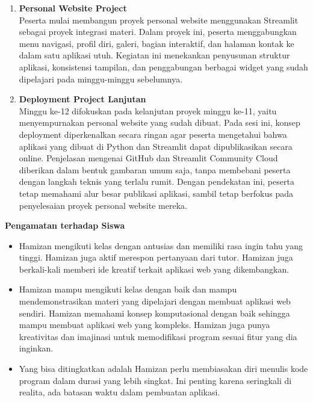 \documentclass[11pt,a4paper]{article}
\begin{document}
\begin{enumerate}[leftmargin=1.6em, label=\arabic*.]
\item \textbf{Personal Website Project}\\
Peserta mulai membangun proyek personal website menggunakan Streamlit sebagai proyek integrasi materi. Dalam proyek ini, peserta menggabungkan menu navigasi, profil diri, galeri, bagian interaktif, dan halaman kontak ke dalam satu aplikasi utuh. Kegiatan ini menekankan penyusunan struktur aplikasi, konsistensi tampilan, dan penggabungan berbagai widget yang sudah dipelajari pada minggu-minggu sebelumnya.

\item \textbf{Deployment Project Lanjutan}\\
Minggu ke-12 difokuskan pada kelanjutan proyek minggu ke-11, yaitu menyempurnakan personal website yang sudah dibuat. Pada sesi ini, konsep deployment diperkenalkan secara ringan agar peserta mengetahui bahwa aplikasi yang dibuat di Python dan Streamlit dapat dipublikasikan secara online. Penjelasan mengenai GitHub dan Streamlit Community Cloud diberikan dalam bentuk gambaran umum saja, tanpa membebani peserta dengan langkah teknis yang terlalu rumit. Dengan pendekatan ini, peserta tetap memahami alur besar publikasi aplikasi, sambil tetap berfokus pada penyelesaian proyek personal website mereka.
\end{enumerate}

\textbf{Pengamatan terhadap Siswa}
\begin{itemize}
\item [--] Hamizan mengikuti kelas dengan antusias dan memiliki rasa ingin tahu yang tinggi. Hamizan juga aktif merespon pertanyaan dari tutor. Hamizan juga berkali-kali memberi ide kreatif terkait aplikasi web yang dikembangkan.
\item [--] Hamizan mampu mengikuti kelas dengan baik dan mampu mendemonstrasikan materi yang dipelajari dengan membuat aplikasi web sendiri. Hamizan memahami konsep komputasional dengan baik sehingga mampu membuat aplikasi web yang kompleks. Hamizan juga punya kreativitas dan imajinasi untuk memodifikasi program sesuai fitur yang dia inginkan.
\item [--] Yang bisa ditingkatkan adalah Hamizan perlu membiasakan diri menulis kode program dalam durasi yang lebih singkat. Ini penting karena seringkali di realita, ada batasan waktu dalam pembuatan aplikasi. 
\end{itemize}
\end{document}
